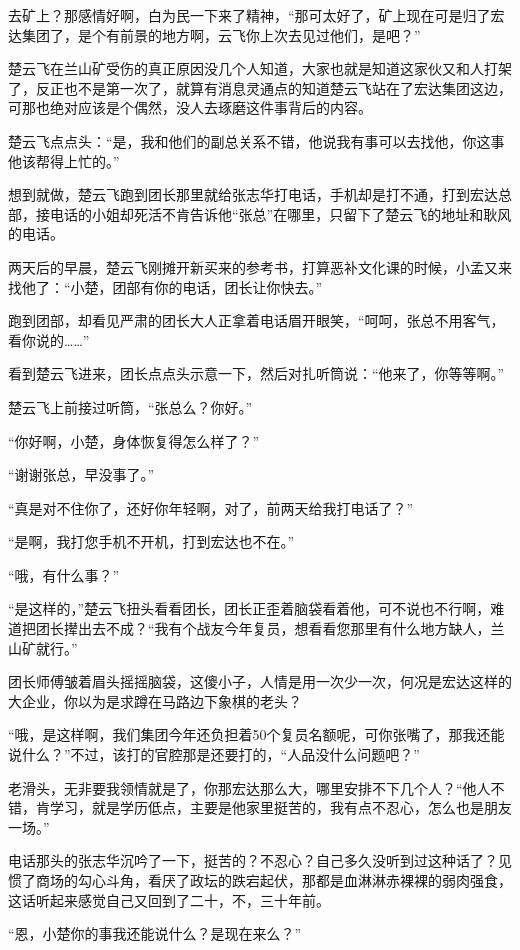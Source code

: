去矿上？那感情好啊，白为民一下来了精神，“那可太好了，矿上现在可是归了宏达集团了，是个有前景的地方啊，云飞你上次去见过他们，是吧？”

楚云飞在兰山矿受伤的真正原因没几个人知道，大家也就是知道这家伙又和人打架了，反正也不是第一次了，就算有消息灵通点的知道楚云飞站在了宏达集团这边，可那也绝对应该是个偶然，没人去琢磨这件事背后的内容。

楚云飞点点头：“是，我和他们的副总关系不错，他说我有事可以去找他，你这事他该帮得上忙的。”

想到就做，楚云飞跑到团长那里就给张志华打电话，手机却是打不通，打到宏达总部，接电话的小姐却死活不肯告诉他“张总”在哪里，只留下了楚云飞的地址和耿风的电话。

两天后的早晨，楚云飞刚摊开新买来的参考书，打算恶补文化课的时候，小孟又来找他了：“小楚，团部有你的电话，团长让你快去。”

跑到团部，却看见严肃的团长大人正拿着电话眉开眼笑，“呵呵，张总不用客气，看你说的……”

看到楚云飞进来，团长点点头示意一下，然后对扎听筒说：“他来了，你等等啊。”

楚云飞上前接过听筒，“张总么？你好。”

“你好啊，小楚，身体恢复得怎么样了？”

“谢谢张总，早没事了。”

“真是对不住你了，还好你年轻啊，对了，前两天给我打电话了？”

“是啊，我打您手机不开机，打到宏达也不在。”

“哦，有什么事？”

“是这样的，”楚云飞扭头看看团长，团长正歪着脑袋看着他，可不说也不行啊，难道把团长撵出去不成？“我有个战友今年复员，想看看您那里有什么地方缺人，兰山矿就行。”

团长师傅皱着眉头摇摇脑袋，这傻小子，人情是用一次少一次，何况是宏达这样的大企业，你以为是求蹲在马路边下象棋的老头？

“哦，是这样啊，我们集团今年还负担着50个复员名额呢，可你张嘴了，那我还能说什么？”不过，该打的官腔那是还要打的，“人品没什么问题吧？”

老滑头，无非要我领情就是了，你那宏达那么大，哪里安排不下几个人？“他人不错，肯学习，就是学历低点，主要是他家里挺苦的，我有点不忍心，怎么也是朋友一场。”

电话那头的张志华沉吟了一下，挺苦的？不忍心？自己多久没听到过这种话了？见惯了商场的勾心斗角，看厌了政坛的跌宕起伏，那都是血淋淋赤裸裸的弱肉强食，这话听起来感觉自己又回到了二十，不，三十年前。

“恩，小楚你的事我还能说什么？是现在来么？”

